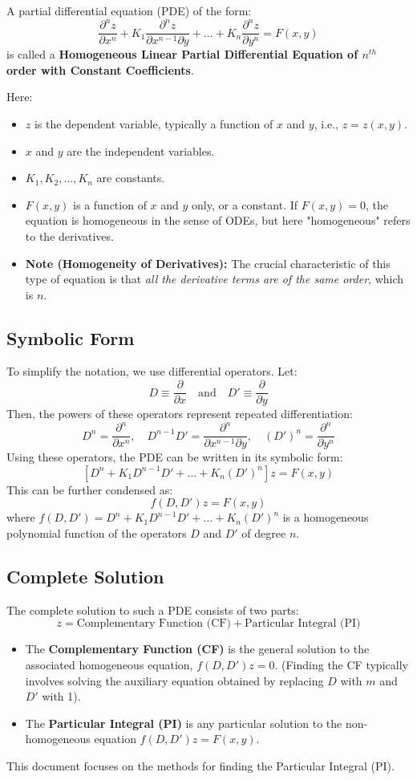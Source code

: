 \documentclass{article}
\theoremstyle{remark}
\begin{document}
	A partial differential equation (PDE) of the form:
	\[
	\frac{\partial^n z}{\partial x^n} + K_1 \frac{\partial^n z}{\partial x^{n-1} \partial y} + \dots + K_n \frac{\partial^n z}{\partial y^n} = F(x, y)
	\]
	is called a \textbf{Homogeneous Linear Partial Differential Equation of $n^{th}$ order with Constant Coefficients}.
	
	Here:
	\begin{itemize}
		\item $z$ is the dependent variable, typically a function of $x$ and $y$, i.e., $z = z(x, y)$.
		\item $x$ and $y$ are the independent variables.
		\item $K_1, K_2, \dots, K_n$ are constants.
		\item $F(x, y)$ is a function of $x$ and $y$ only, or a constant. If $F(x,y) = 0$, the equation is homogeneous in the sense of ODEs, but here "homogeneous" refers to the derivatives.
		\item \textbf{Note (Homogeneity of Derivatives):} The crucial characteristic of this type of equation is that \textit{all the derivative terms are of the same order}, which is $n$.
	\end{itemize}
	
	\subsection{Symbolic Form}
	To simplify the notation, we use differential operators. Let:
	\[
	D \equiv \frac{\partial}{\partial x} \quad \text{and} \quad D' \equiv \frac{\partial}{\partial y}
	\]
	Then, the powers of these operators represent repeated differentiation:
	\[
	D^n = \frac{\partial^n}{\partial x^n}, \quad D^{n-1}D' = \frac{\partial^n}{\partial x^{n-1} \partial y}, \quad (D')^n = \frac{\partial^n}{\partial y^n}
	\]
	Using these operators, the PDE can be written in its symbolic form:
	\[
	[D^n + K_1 D^{n-1}D' + \dots + K_n (D')^n] z = F(x, y)
	\]
	This can be further condensed as:
	\[
	f(D, D') z = F(x, y)
	\]
	where $f(D, D') = D^n + K_1 D^{n-1}D' + \dots + K_n (D')^n$ is a homogeneous polynomial function of the operators $D$ and $D'$ of degree $n$.
	
	\subsection{Complete Solution}
	The complete solution to such a PDE consists of two parts:
	\[
	z = \text{Complementary Function (CF)} + \text{Particular Integral (PI)}
	\]
	\begin{itemize}
		\item The \textbf{Complementary Function (CF)} is the general solution to the associated homogeneous equation, $f(D, D') z = 0$. (Finding the CF typically involves solving the auxiliary equation obtained by replacing $D$ with $m$ and $D'$ with 1).
		\item The \textbf{Particular Integral (PI)} is any particular solution to the non-homogeneous equation $f(D, D') z = F(x, y)$.
	\end{itemize}
	This document focuses on the methods for finding the Particular Integral (PI).
	
\end{document}
